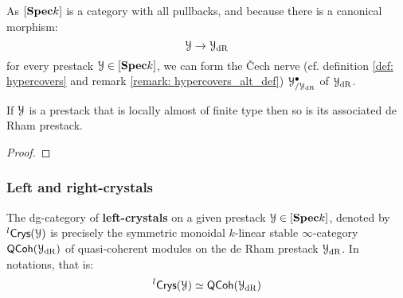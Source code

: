                 \begin{remark} \label{remark: cech_nerves_of_de_rham_spaces}
                    As $[\mathbf{Spec} k]$ is a category with all pullbacks, and because there is a canonical morphism:
                        $$\mathcal{Y} \to \mathcal{Y}_{\mathrm{dR}}$$
                    for every prestack $\mathcal{Y} \in [\mathbf{Spec} k]$, we can form the \v{C}ech nerve (cf. definition \ref{def: hypercovers} and remark \ref{remark: hypercovers_alt_def}) $\mathcal{Y}^{\bullet}_{/\mathcal{Y}_{\mathrm{dR}}}$ of $\mathcal{Y}_{\mathrm{dR}}$. 
                \end{remark}
                
                \begin{proposition} \label{prop: laft_de_rham_spaces}
                    If $\mathcal{Y}$ is a prestack that is locally almost of finite type then so is its associated de Rham prestack.  
                \end{proposition}
                    \begin{proof}
                        
                    \end{proof}
                    
            \subsubsection{Left and right-crystals}
                \begin{definition} \label{def: left_crystals}
                    The dg-category of \textbf{left-crystals} on a given prestack $\mathcal{Y} \in [\mathbf{Spec} k]$, denoted by ${}^l\mathsf{Crys}(\mathcal{Y})$ is precisely the symmetric monoidal $k$-linear stable $\infty$-category $\mathsf{QCoh}(\mathcal{Y}_{\mathrm{dR}})$ of quasi-coherent modules on the de Rham prestack $\mathcal{Y}_{\mathrm{dR}}$. In notations, that is:
                        $${}^l\mathsf{Crys}(\mathcal{Y}) \simeq \mathsf{QCoh}(\mathcal{Y}_{\mathrm{dR}})$$
                \end{definition}
                
